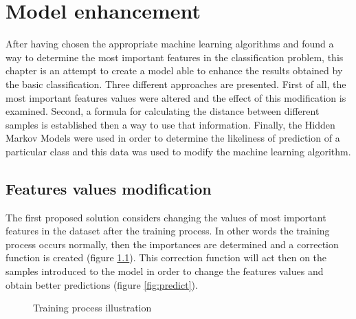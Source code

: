 \chapter{Model enhancement}
After having chosen the appropriate machine learning algorithms and found a way to determine the most important features in the classification problem, this chapter is an attempt to create a model able to enhance the results obtained by the basic classification. Three different approaches are presented. First of all, the most important features values were altered and the effect of this modification is examined. Second, a formula for calculating the distance between different samples is established then a way to use that information. Finally, the Hidden Markov Models were used in order to determine the likeliness of prediction of a particular class and this data was used to modify the machine learning algorithm. 

\section{Features values modification}
The first proposed solution considers changing the values of most important features in the dataset after the training process. In other words the training process occurs normally, then the importances are determined and a correction function is created (figure \ref{fig:train}). This correction function will act then on the samples introduced to the model in order to change the features values and obtain better predictions (figure \ref{fig:predict}). 

\begin{figure}[H]
    \centering
    \caption{Training process illustration} \label{fig:train}
\end{figure}

